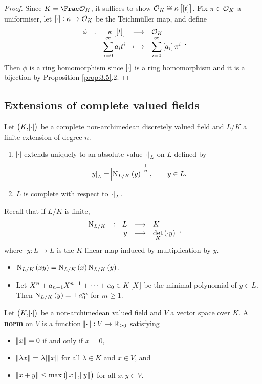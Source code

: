\begin{proof}
Since $ K = \Frac \OOO_K $, it suffices to show $ \OOO_K \cong \kappa\sbr{\sbr{t}} $. Fix $ \pi \in \mathcal{O}_K $ a uniformiser, let $ \sbr{\cdot} : \kappa \to \OOO_K $ be the Teichm\"uller map, and define
$$ \function[\phi]{\kappa\sbr{\sbr{t}}}{\OOO_K}{\sum_{i = 0}^\infty a_it^i}{\sum_{i = 0}^\infty \sbr{a_i}\pi^i}. $$
Then $ \phi $ is a ring homomorphism since $ \sbr{\cdot} $ is a ring homomorphism and it is a bijection by Proposition \ref{prop:3.5}.$ 2 $.
\end{proof}

\subsection{Extensions of complete valued fields}


\begin{theorem}
\label{thm:6.1}
Let $ \br{K, \abs{\cdot}} $ be a complete non-archimedean discretely valued field and $ L / K $ a finite extension of degree $ n $.
\begin{enumerate}
\item $ \abs{\cdot} $ extends uniquely to an absolute value $ \abs{\cdot}_L $ on $ L $ defined by
$$ \abs{y}_L = \abs{\N_{L / K}\br{y}}^{\tfrac{1}{n}}, \qquad y \in L. $$
\item $ L $ is complete with respect to $ \abs{\cdot}_L $.
\end{enumerate}
\end{theorem}

Recall that if $ L / K $ is finite,
$$ \function[\N_{L / K}]{L}{K}{y}{\det_K \br{\cdot y}}, $$
where $ \cdot y : L \to L $ is the $ K $-linear map induced by multiplication by $ y $.

\begin{fact*}
\hfill
\begin{itemize}
\item $ \N_{L / K}\br{xy} = \N_{L / K}\br{x}\N_{L / K}\br{y} $.
\item Let $ X^n + a_{n - 1}X^{n - 1} + \dots + a_0 \in K\sbr{X} $ be the minimal polynomial of $ y \in L $. Then $ \N_{L / K}\br{y} = \pm a_0^m $ for $ m \ge 1 $.
\end{itemize}
\end{fact*}

\pagebreak

\begin{definition}
Let $ \br{K, \abs{\cdot}} $ be a non-archimedean valued field and $ V $ a vector space over $ K $. A \textbf{norm} on $ V $ is a function $ \norm{\cdot} : V \to \mathbb{R}_{\ge 0} $ satisfying
\begin{itemize}
\item $ \norm{x} = 0 $ if and only if $ x = 0 $,
\item $ \norm{\lambda x} = \abs{\lambda}\norm{x} $ for all $ \lambda \in K $ and $ x \in V $, and
\item $ \norm{x + y} \le \max\br{\norm{x}, \norm{y}} $ for all $ x, y \in V $.
\end{itemize}
\end{definition}

